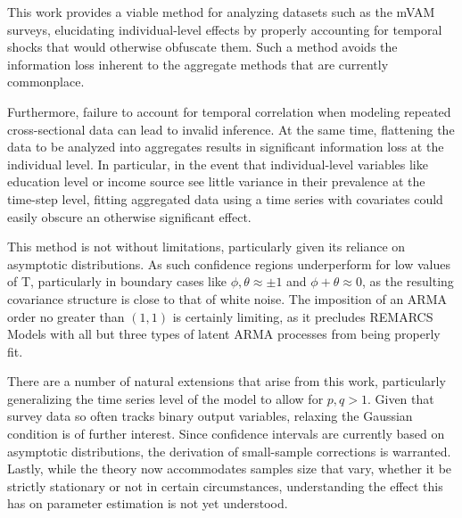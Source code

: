     This work provides a viable method for analyzing datasets such as the mVAM surveys, elucidating individual-level effects by properly accounting for temporal shocks that would otherwise obfuscate them. Such a method avoids the information loss inherent to the aggregate methods that are currently commonplace.



Furthermore, failure to account for temporal correlation when modeling repeated cross-sectional data can lead to invalid inference. At the same time, flattening the data to be analyzed into aggregates results in significant information loss at the individual level. In particular, in the event that individual-level variables like education level or income source see little variance in their prevalence at the time-step level, fitting aggregated data using a time series with covariates could easily obscure an otherwise significant effect.

    This method is not without limitations, particularly given its reliance on asymptotic distributions. As such confidence regions underperform for low values of T, particularly in boundary cases like $\phi,\theta \approx \pm1$ and $\phi + \theta \approx 0$, as the resulting covariance structure is close to that of white noise. The imposition of an ARMA order no greater than $(1,1)$ is certainly limiting, as it precludes REMARCS Models with all but three types of latent ARMA processes from being properly fit.  

    There are a number of natural extensions that arise from this work, particularly 
    generalizing the time series level of the model to allow for $p,q > 1$. Given that 
    survey data so often tracks binary output variables, relaxing the Gaussian condition 
    is of further interest. Since confidence intervals are currently based on asymptotic
    distributions, the derivation of small-sample corrections is warranted. Lastly, 
    while the theory now accommodates samples size that vary, whether it be strictly stationary
    or not in certain circumstances, understanding the effect this has on parameter estimation
    is not yet understood.
